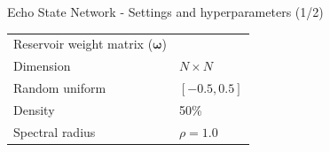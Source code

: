 \documentclass[aspectratio=169]{beamer}
\begin{document}
\begin{frame}[t]{Echo State Network  - Settings and hyperparameters (1/2)}
\begin{minipage}[t]{0.7\textwidth}
\begin{table}[ht]
\begin{tabular}{ll}
				\midrule
				Reservoir weight matrix ($\boldsymbol{\omega}$)     &                                      \\
				\hspace{2.5mm} Dimension                            & $N \times N$                         \\
				\hspace{2.5mm} Random uniform                       & $[-0.5, 0.5]$                        \\
				\hspace{2.5mm} Density                              & 50\%                                 \\
				\hspace{2.5mm} Spectral radius                      & $\rho = 1.0$                         \\
				\bottomrule
				\end{tabular}
			\end{table}
    \end{minipage}
\end{frame}
\end{document}
